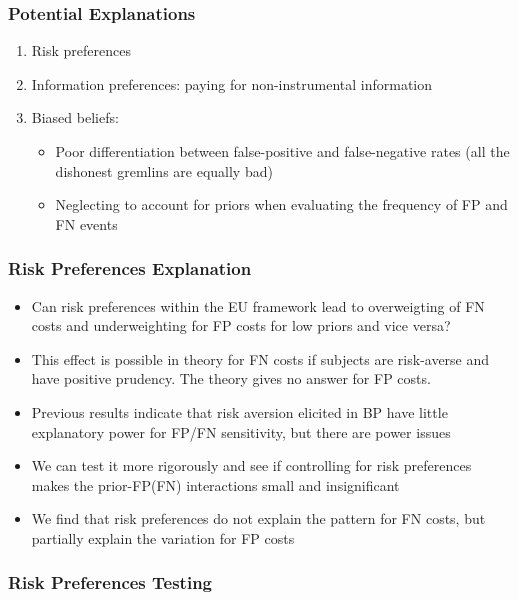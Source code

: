\documentclass[11pt,hyperref={bookmarks=false}]{beamer}
\begin{document}
\begin{frame}
\frametitle{Potential Explanations}
\begin{enumerate}
\item Risk preferences
\item Information preferences: paying for non-instrumental information
\item Biased beliefs:
\begin{itemize}
\item Poor differentiation between false-positive and false-negative rates (all the dishonest gremlins are equally bad)
\item Neglecting to account for priors when evaluating the frequency of FP and FN events
\end{itemize}
\end{enumerate}
\end{frame}


\begin{frame}
\frametitle{Risk Preferences Explanation}
\begin{itemize}
\item Can risk preferences within the EU framework lead to overweigting of FN costs and underweighting for FP costs for low priors and vice versa?
\item This effect is possible in theory for FN costs if subjects are risk-averse and have positive prudency. The theory gives no answer for FP costs.
\item Previous results indicate that risk aversion elicited in BP have little explanatory power for FP/FN sensitivity, but there are power issues
\item We can test it more rigorously and see if controlling for risk preferences makes the prior-FP(FN) interactions small and insignificant
\item We find that risk preferences do not explain the pattern for FN costs, but partially explain the variation for FP costs
\end{itemize}
\end{frame}


\begin{frame}
\frametitle{Risk Preferences Testing}
\scriptsize

\end{frame}
\end{document}
